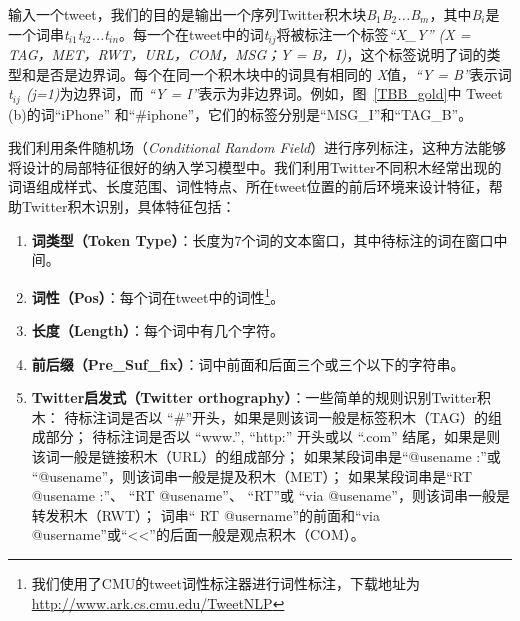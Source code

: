 输入一个tweet，我们的目的是输出一个序列Twitter积木块\emph{B$_1$B$_2$...B$_m$}，其中\emph{B$_i$}是一个词串\emph{t$_{i1}$t$_{i2}$...t$_{in}$}。每一个在tweet中的词\emph{t$_{ij}$}将被标注一个标签\emph{“X\_Y” (X = \mbox{TAG，MET，RWT，URL，COM，MSG}；Y = \mbox{B，I)}}，这个标签说明了词的类型和是否是边界词。每个在同一个积木块中的词具有相同的 \emph{X}值，\emph{“Y = B”}表示词\emph{t$_{ij}$ (j=1)}为边界词，而 \emph{“Y = I”}表示为非边界词。例如，图~\ref{TBB_gold}中 Tweet (b)的词“iPhone” 和“\#iphone”，它们的标签分别是“MSG\_I”和“TAG\_B”。 

我们利用条件随机场（\emph{Conditional Random Field}）进行序列标注，这种方法能够将设计的局部特征很好的纳入学习模型中。我们利用Twitter不同积木经常出现的词语组成样式、长度范围、词性特点、所在tweet位置的前后环境来设计特征，帮助Twitter积木识别，具体特征包括：

  \begin{enumerate}
  \item {\bf 词类型（Token Type）}：长度为7个词的文本窗口，其中待标注的词在窗口中间。
  \item {\bf 词性（Pos）}：每个词在tweet中的词性\footnote{我们使用了CMU的tweet词性标注器进行词性标注，下载地址为\url{http://www.ark.cs.cmu.edu/TweetNLP}}。
  \item {\bf 长度（Length）}：每个词中有几个字符。
  \item {\bf 前后缀（Pre\_Suf\_fix）}：词中前面和后面三个或三个以下的字符串。
  \item {\bf Twitter启发式（Twitter orthography）}：一些简单的规则识别Twitter积木：
待标注词是否以 “\#”开头，如果是则该词一般是标签积木（TAG）的组成部分；
待标注词是否以 “www.”, “http:” 开头或以 “.com” 结尾，如果是则该词一般是链接积木（URL）的组成部分；
如果某段词串是“@usename :”或 “@usename”，则该词串一般是提及积木（MET）； 
如果某段词串是“RT @usename :”、 “RT @usename”、 “RT”或 “via @usename”，则该词串一般是转发积木（RWT）； 
词串“ RT @username”的前面和“via @username”或“<<”的后面一般是观点积木（COM）。 
\end{enumerate}    

